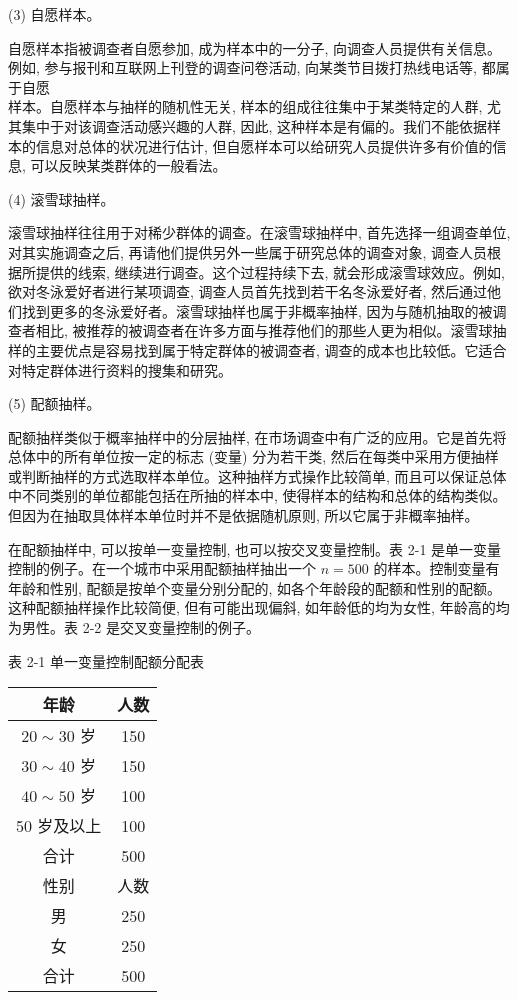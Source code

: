 \documentclass[10pt]{article}
\begin{document}
\begin{CJK*}{UTF8}{bsmi}
(3) 自愿样本。

自愿样本指被调查者自愿参加, 成为样本中的一分子, 向调查人员提供有关信息。例如, 参与报刊和互联网上刊登的调查问卷活动, 向某类节目拨打热线电话等, 都属于自愿\\
样本。自愿样本与抽样的随机性无关, 样本的组成往往集中于某类特定的人群, 尤其集中于对该调查活动感兴趣的人群, 因此, 这种样本是有偏的。我们不能依据样本的信息对总体的状况进行估计, 但自愿样本可以给研究人员提供许多有价值的信息, 可以反映某类群体的一般看法。

(4) 滚雪球抽样。

滚雪球抽样往往用于对稀少群体的调查。在滚雪球抽样中, 首先选择一组调查单位,对其实施调查之后, 再请他们提供另外一些属于研究总体的调查对象, 调查人员根据所提供的线索, 继续进行调查。这个过程持续下去, 就会形成滚雪球效应。例如, 欲对冬泳爱好者进行某项调查, 调查人员首先找到若干名冬泳爱好者, 然后通过他们找到更多的冬泳爱好者。滚雪球抽样也属于非概率抽样, 因为与随机抽取的被调查者相比, 被推荐的被调查者在许多方面与推荐他们的那些人更为相似。滚雪球抽样的主要优点是容易找到属于特定群体的被调查者, 调查的成本也比较低。它适合对特定群体进行资料的搜集和研究。

(5) 配额抽样。

配额抽样类似于概率抽样中的分层抽样, 在市场调查中有广泛的应用。它是首先将总体中的所有单位按一定的标志 (变量) 分为若干类, 然后在每类中采用方便抽样或判断抽样的方式选取样本单位。这种抽样方式操作比较简单, 而且可以保证总体中不同类别的单位都能包括在所抽的样本中, 使得样本的结构和总体的结构类似。但因为在抽取具体样本单位时并不是依据随机原则, 所以它属于非概率抽样。

在配额抽样中, 可以按单一变量控制, 也可以按交叉变量控制。表 2-1 是单一变量控制的例子。在一个城市中采用配额抽样抽出一个 $n=500$ 的样本。控制变量有年龄和性别, 配额是按单个变量分别分配的, 如各个年龄段的配额和性别的配额。这种配额抽样操作比较简便, 但有可能出现偏斜, 如年龄低的均为女性, 年龄高的均为男性。表 2-2 是交叉变量控制的例子。

表 2-1 单一变量控制配额分配表

\begin{center}
\begin{tabular}{cc}
\hline
年龄 & 人数 \\
\hline
$20 \sim 30$ 岁 & 150 \\
$30 \sim 40$ 岁 & 150 \\
$40 \sim 50$ 岁 & 100 \\
50 岁及以上 & 100 \\
\hline
合计 & 500 \\
\hline
性别 & 人数 \\
\hline
男 & 250 \\
\hline
女 & 250 \\
\hline
合计 & 500 \\
\hline
\end{tabular}
\end{center}


\end{CJK*}
\end{document}
